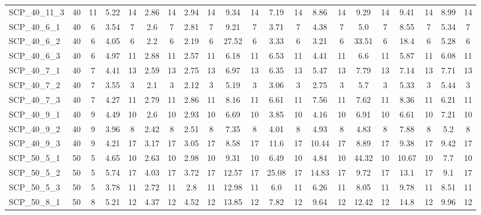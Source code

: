 \begin{sidewaystable}[!ht]
{\begin{tabular}{lcccccccccccccccccccc}
SCP\_40\_11\_3 & 40 & 11 & 5.22 & 14 &  \textcolor{blue2}{2.86} & 14 & 2.94 & 14 & 9.34 & 14 & 7.19 & 14 & 8.86 & 14 & 9.29 & 14 & 9.41 & 14 & 8.99 & 14 \\
SCP\_40\_6\_1 & 40 & 6 & 3.54 & 7 &  \textcolor{blue2}{2.6} & 7 & 2.81 & 7 & 9.21 & 7 & 3.71 & 7 & 4.38 & 7 & 5.0 & 7 & 8.55 & 7 & 5.34 & 7 \\
SCP\_40\_6\_2 & 40 & 6 & 4.05 & 6 & 2.2 & 6 &  \textcolor{blue2}{2.19} & 6 & 27.52 & 6 & 3.33 & 6 & 3.21 & 6 & 33.51 & 6 & 18.4 & 6 & 5.28 & 6 \\
SCP\_40\_6\_3 & 40 & 6 & 4.97 & 11 & 2.88 & 11 &  \textcolor{blue2}{2.57} & 11 & 6.18 & 11 & 6.53 & 11 & 4.41 & 11 & 6.6 & 11 & 5.87 & 11 & 6.08 & 11 \\
SCP\_40\_7\_1 & 40 & 7 & 4.41 & 13 &  \textcolor{blue2}{2.59} & 13 & 2.75 & 13 & 6.97 & 13 & 6.35 & 13 & 5.47 & 13 & 7.79 & 13 & 7.14 & 13 & 7.71 & 13 \\
SCP\_40\_7\_2 & 40 & 7 & 3.55 & 3 &  \textcolor{blue2}{2.1} & 3 & 2.12 & 3 & 5.19 & 3 & 3.06 & 3 & 2.75 & 3 & 5.7 & 3 & 5.33 & 3 & 5.44 & 3 \\
SCP\_40\_7\_3 & 40 & 7 & 4.27 & 11 &  \textcolor{blue2}{2.79} & 11 & 2.86 & 11 & 8.16 & 11 & 6.61 & 11 & 7.56 & 11 & 7.62 & 11 & 8.36 & 11 & 6.21 & 11 \\
SCP\_40\_9\_1 & 40 & 9 & 4.49 & 10 &  \textcolor{blue2}{2.6} & 10 & 2.93 & 10 & 6.69 & 10 & 3.85 & 10 & 4.16 & 10 & 6.91 & 10 & 6.61 & 10 & 7.21 & 10 \\
SCP\_40\_9\_2 & 40 & 9 & 3.96 & 8 &  \textcolor{blue2}{2.42} & 8 & 2.51 & 8 & 7.35 & 8 & 4.01 & 8 & 4.93 & 8 & 4.83 & 8 & 7.88 & 8 & 5.2 & 8 \\
SCP\_40\_9\_3 & 40 & 9 & 4.21 & 17 & 3.17 & 17 &  \textcolor{blue2}{3.05} & 17 & 8.58 & 17 & 11.6 & 17 & 10.44 & 17 & 8.89 & 17 & 9.38 & 17 & 9.42 & 17 \\
SCP\_50\_5\_1 & 50 & 5 & 4.65 & 10 &  \textcolor{blue2}{2.63} & 10 & 2.98 & 10 & 9.31 & 10 & 6.49 & 10 & 4.84 & 10 & 44.32 & 10 & 10.67 & 10 & 7.7 & 10 \\
SCP\_50\_5\_2 & 50 & 5 & 5.74 & 17 & 4.03 & 17 &  \textcolor{blue2}{3.72} & 17 & 12.57 & 17 & 25.08 & 17 & 14.83 & 17 & 9.72 & 17 & 13.1 & 17 & 9.1 & 17 \\
SCP\_50\_5\_3 & 50 & 5 & 3.78 & 11 &  \textcolor{blue2}{2.72} & 11 & 2.8 & 11 & 12.98 & 11 & 6.0 & 11 & 6.26 & 11 & 8.05 & 11 & 9.78 & 11 & 8.51 & 11 \\
SCP\_50\_8\_1 & 50 & 8 & 5.21 & 12 &  \textcolor{blue2}{4.37} & 12 & 4.52 & 12 & 13.85 & 12 & 7.82 & 12 & 9.64 & 12 & 12.42 & 12 & 14.8 & 12 & 9.96 & 12 \\

\end{tabular}}
\end{sidewaystable}
